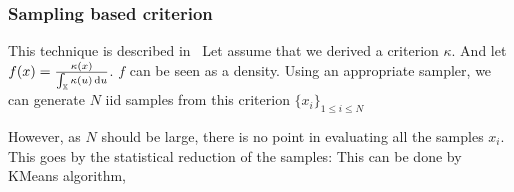 \documentclass[../../Main_ManuscritThese.tex]{subfiles}
\begin{document}
%   





\subsubsection{Sampling based criterion}
\label{sec:sampling_based_criterion}
This technique is described in~\cite{dubourg_reliability-based_2011}
Let assume that we derived a criterion $\kappa$. And let $f(x) = \frac{\kappa(x)}{\int_{\mathbb{X}}\kappa(u)\,\mathrm{d}u}$. $f$ can be seen as a density.
  Using an appropriate sampler, we can generate $N$ iid samples from this criterion $\{x_i\}_{1\leq i \leq N}$
  
  However, as $N$ should be large, there is no point in evaluating all the samples $x_i$. This goes by the statistical reduction of the samples:
  This can be done by KMeans algorithm, 



  
\end{document}
